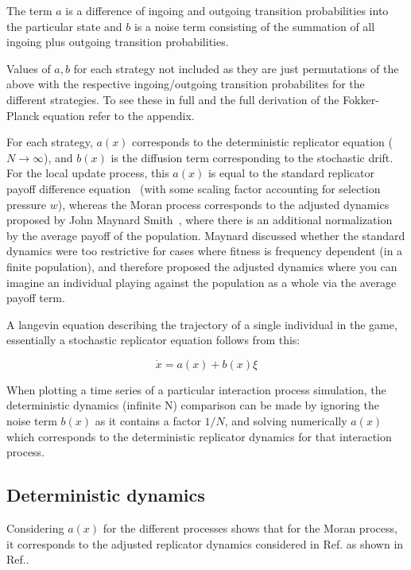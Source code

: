 \documentclass[%
 reprint,
 amsmath,amssymb,
 aps,
]{revtex4-2}
\begin{document}
The term
$a$ is a difference of ingoing and outgoing 
transition probabilities into the particular state and 
$b$ is a noise term consisting of the summation of 
all ingoing plus outgoing transition probabilities. 

Values of $a,b$ for each strategy not included as they are just 
permutations of the above with the respective ingoing/outgoing
transition probabilites for the different strategies. To see 
these in full and the full derivation of the Fokker-Planck
equation refer to the appendix.


For each strategy, $a(x)$ corresponds to the deterministic replicator equation ($N \rightarrow \infty$),
and $b(x)$ is the diffusion term corresponding to the stochastic drift. 
For the local update process, this $a(x)$ is equal to the standard replicator payoff difference equation~\cite{evolution_pop_dynamics}
(with some scaling factor accounting for selection pressure $w$),
whereas the Moran process corresponds to the adjusted dynamics proposed by John Maynard 
Smith~\cite{evolution_maynard}, 
where there is an additional normalization by the average payoff of the population.
Maynard discussed whether the standard dynamics were too restrictive for cases
where fitness is frequency dependent (in a finite population), and therefore proposed the 
adjusted dynamics where you can imagine an individual playing against the population as a whole
via the average payoff term.

A langevin equation describing the trajectory of a single individual in the
game, essentially a stochastic replicator equation follows from this:

\begin{equation}
\dot{x} = a(x) + b(x) \xi
\end{equation}

When plotting a time series of a particular interaction process simulation,
the deterministic dynamics (infinite N) comparison can be made by 
ignoring the noise term $b(x)$ as it contains a factor $1/N$, and 
solving numerically $a(x)$ which corresponds to the deterministic 
replicator dynamics for that interaction process.

\subsection{Deterministic dynamics}

Considering $a(x)$ for the different processes shows
that for the Moran process, it corresponds to the adjusted 
replicator dynamics considered in Ref.\cite{evolution_maynard} as shown in 
Ref.\cite{drift_reversal_paper}.
\end{document}
